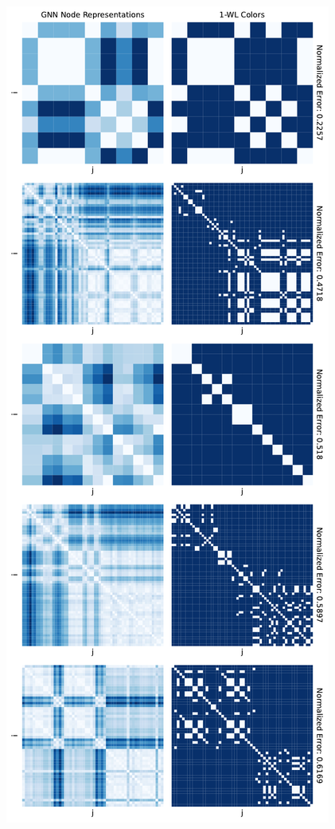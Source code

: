 \begin{figure}[!ht]
    \centering
    \begin{minipage}[b]{0.45433880459\textwidth}
        \centering
        \includegraphics[width=\textwidth, left]{Figures/heatmaps_PROTEINS_0.pdf}

\end{minipage}
\end{figure}
